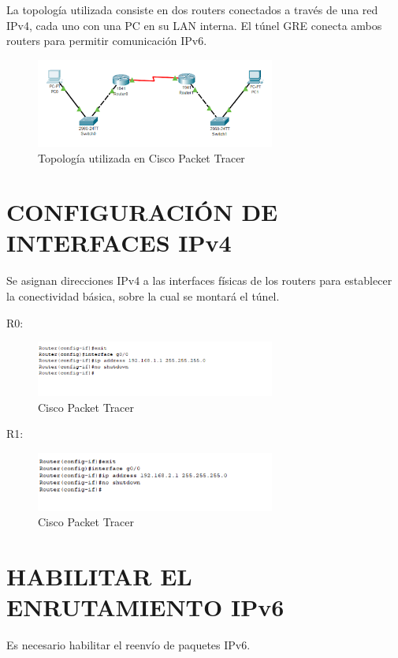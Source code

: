 \documentclass[12pt]{article}
\begin{document}
	{\large La topología utilizada consiste en dos routers conectados a través de una red IPv4, cada uno con una PC en su LAN interna. El túnel GRE conecta ambos routers para permitir comunicación IPv6.}
	
	\begin{figure}[h!]
	\centering
	\includegraphics[width=0.7\textwidth]{../tpipv6-2/imagenes/topologia}
	\caption{Topología utilizada en Cisco Packet Tracer}
	\end{figure}
	
	\section{CONFIGURACIÓN DE INTERFACES IPv4}
	{\large Se asignan direcciones IPv4 a las interfaces físicas de los routers para establecer la conectividad básica, sobre la cual se montará el túnel.}
	
	{\large R0:}
	
	\begin{figure}[h!]
		\centering
		\includegraphics[width=0.7\textwidth]{../tpipv6-2/imagenes/confipv4r0}
		\caption{Cisco Packet Tracer}
	\end{figure}
	
	{\large R1:}
	
	\begin{figure}[h!]
		\centering
		\includegraphics[width=0.7\textwidth]{../tpipv6-2/imagenes/confipv4r1}
		\caption{Cisco Packet Tracer}
	\end{figure}
	
	\newpage
	
	\section{HABILITAR EL ENRUTAMIENTO IPv6}
	{\large Es necesario habilitar el reenvío de paquetes IPv6.}
	
\end{document}
